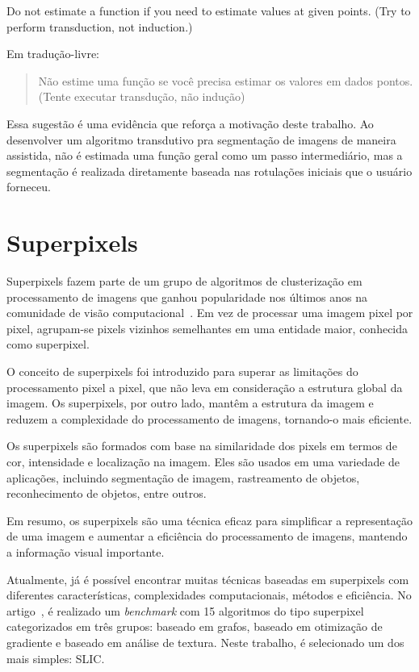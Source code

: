 \begin{displayquote}

  Do not estimate a function if you need to estimate values at given
  points. (Try to perform transduction, not induction.)

\end{displayquote}

Em tradução-livre: \blockquote{Não estime uma função se você precisa estimar
os valores em dados pontos. (Tente executar transdução, não
indução)}. Essa sugestão é uma evidência que reforça a motivação
deste trabalho. Ao desenvolver um algoritmo transdutivo pra
segmentação de imagens de maneira assistida, não é estimada uma função
geral como um passo intermediário, mas a segmentação é realizada
diretamente baseada nas rotulações iniciais que o usuário forneceu.


\section{Superpixels}\label{sec:teorica-superpixel}

Superpixels fazem parte de um grupo de algoritmos de clusterização em
processamento de imagens que ganhou popularidade nos últimos anos na
comunidade de visão computacional~\cite{SuperpixelSurvey2020}. Em vez
de processar uma imagem pixel por pixel, agrupam-se pixels vizinhos
semelhantes em uma entidade maior, conhecida como superpixel.

O conceito de superpixels foi introduzido para superar as limitações
do processamento pixel a pixel, que não leva em consideração a
estrutura global da imagem. Os superpixels, por outro lado, mantêm a
estrutura da imagem e reduzem a complexidade do processamento de
imagens, tornando-o mais eficiente.

Os superpixels são formados com base na similaridade dos pixels em
termos de cor, intensidade e localização na imagem. Eles são usados em
uma variedade de aplicações, incluindo segmentação de imagem,
rastreamento de objetos, reconhecimento de objetos, entre outros.

Em resumo, os superpixels são uma técnica eficaz para simplificar a
representação de uma imagem e aumentar a eficiência do processamento
de imagens, mantendo a informação visual importante.

Atualmente, já é possível encontrar muitas técnicas baseadas em
superpixels com diferentes características, complexidades
computacionais, métodos e eficiência. No
artigo~\cite{SuperPixelBenchmark2017}, é realizado um \textit{benchmark} com 15
algoritmos do tipo superpixel categorizados em três grupos: baseado em grafos,
baseado em otimização de gradiente e baseado em análise de
textura. Neste trabalho, é selecionado um dos mais simples: \gls{SLIC}.

